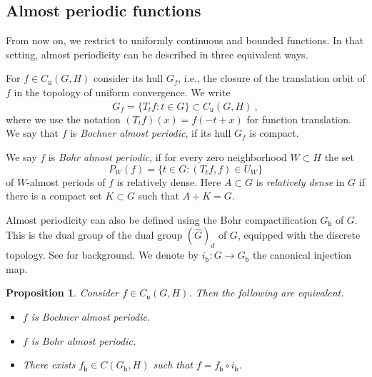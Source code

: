 \documentclass[11pt, a4wide]{amsart}
\newtheorem{proposition}[lemma]{Proposition}
\numberwithin{lemma}{section}
\begin{document}
\begin{appendix}
\subsection{Almost periodic functions}

From now on, we restrict to uniformly continuous and bounded functions.  In that setting, almost periodicity can be described in three equivalent ways. 


\medskip


For $f\in C_\mathsf{u}(G,H)$ consider its hull $G_f$, i.e., the closure of the translation orbit of $f$ in the topology of uniform convergence. We write
%
\begin{displaymath}
G_f = \overline{\{T_tf: t\in G\}} \subset C_\mathsf{u}(G,H) \ ,
\end{displaymath}
%
where we use the notation $(T_tf)(x)=f(-t+x)$ for function translation.
We say that $f$ is \textit{Bochner almost periodic}, if its hull $G_f$ is compact.

\medskip


We say $f$ is \textit{Bohr almost periodic}, if for every zero neighborhood $W \subset H$ the set
%
\begin{displaymath}
P_W(f) =\{t\in G :  (T_tf, f)\in U_W\}
\end{displaymath}
%
of $W$-almost periods of $f$ is relatively dense. Here $A\subset G$ is \textit{relatively dense} in $G$ if there is a compact set $K\subset G$ such that $A+K=G$.

\medskip

Almost periodicity can also be defined using the Bohr compactification $G_\mathsf{b}$ of $G$. This is the dual group of the dual group $(\widehat G)_d$ of $G$, equipped with the discrete topology. See \cite[Sec.~4.7]{Fol} for background. We denote by $i_\mathsf{b}:G\to G_\mathsf{b}$ the canonical injection map.

\begin{proposition}\label{prop:BochBohr}
Consider $f\in C_\mathsf{u}(G,H)$. Then the following are equivalent.
\begin{itemize}
\item[(i)] $f$ is Bochner almost periodic.
\item[(ii)] $f$ is Bohr almost periodic.
\item[(iii)] There exists $f_\mathsf{b}\in C(G_\mathsf{b}, H)$ such that $f=f_\mathsf{b}\circ i_\mathsf{b}$.
\end{itemize}
\end{proposition}


\end{appendix}
\end{document}
